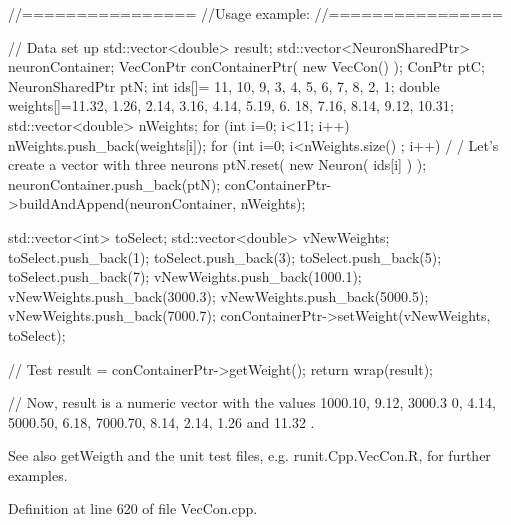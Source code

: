 \begin{DoxyCode}
        //================
        //Usage example:
        //================

        // Data set up
                std::vector<double> result;
                        std::vector<NeuronSharedPtr> neuronContainer;
                        VecConPtr conContainerPtr( new VecCon() );
                        ConPtr    ptC;
                        NeuronSharedPtr ptN;
                        int ids[]= {11, 10, 9, 3, 4, 5, 6, 7, 8, 2, 1};
                        double weights[]={11.32, 1.26, 2.14, 3.16, 4.14, 5.19, 6.
      18, 7.16, 8.14, 9.12, 10.31};
                        std::vector<double> nWeights;
                        for (int i=0; i<11; i++) {
                        nWeights.push_back(weights[i]);
                        }
                        for (int i=0; i<nWeights.size() ; i++) {                         /
      / Let's create a vector with three neurons
                        ptN.reset( new Neuron( ids[i] ) );
                        neuronContainer.push_back(ptN);
                        }
                        conContainerPtr->buildAndAppend(neuronContainer, nWeights);

                        std::vector<int> toSelect;
                        std::vector<double> vNewWeights;
                        toSelect.push_back(1);
                        toSelect.push_back(3);
                        toSelect.push_back(5);
                        toSelect.push_back(7);
                        vNewWeights.push_back(1000.1);
                        vNewWeights.push_back(3000.3);
                        vNewWeights.push_back(5000.5);
                        vNewWeights.push_back(7000.7);
                        conContainerPtr->setWeight(vNewWeights, toSelect);

        // Test
                        result = conContainerPtr->getWeight();
                        return wrap(result);

        // Now, result is a numeric vector with the values  1000.10, 9.12, 3000.3
      0, 4.14, 5000.50, 6.18, 7000.70, 8.14, 2.14, 1.26 and 11.32 .
\end{DoxyCode}


\begin{DoxySeeAlso}{See also}
getWeigth and the unit test files, e.g. runit.Cpp.VecCon.R, for further examples. 
\end{DoxySeeAlso}


Definition at line 620 of file VecCon.cpp.



